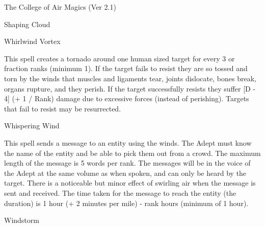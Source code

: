 \begin{Chapter}{The College of Air Magics (Ver 2.1)}
\begin{spell}[S-13]{Shaping Cloud }
\begin{effects}
\end{effects}
\end{spell}

\begin{spell}[S-14]{Whirlwind Vortex }

\begin{effects}
 This  spell  creates  a  tornado  around  one 
human  sized  target  for  every  3  or  fraction  ranks 
(minimum 1). If the target fails to resist they are so 
tossed  and  torn  by  the  winds  that  muscles  and 
ligaments tear, joints dislocate, bones break, organs 
rupture,  and  they  perish.  If  the  target  successfully 
resists they suffer [D - 4] (+ 1 / Rank) damage due 
to  excessive  forces  (instead  of  perishing).  Targets 
that fail to resist may be resurrected. 

\end{effects}
\end{spell}

\begin{spell}[S-15]{Whispering Wind }

\begin{effects}
 This  spell  sends  a  message  to  an  entity 
using the winds. The Adept must know the name of 
the  entity  and  be  able  to  pick  them  out  from  a 
crowd.  The  maximum  length  of  the  message  is  5 
words per rank. The messages will be in the voice 
of  the  Adept  at the  same  volume  as  when  spoken, 
and  can  only  be  heard  by  the  target.  There  is  a 
noticeable but minor effect of swirling air when the 
message  is  sent  and  received.  The  time  taken  for 
the  message  to  reach  the  entity  (the  duration)  is  1 
hour (+ 2 minutes per mile) - rank hours (minimum 
of 1 hour). 

\end{effects}
\end{spell}

\begin{spell}[S-16]{Windstorm }


\end{spell}
\end{Chapter}
